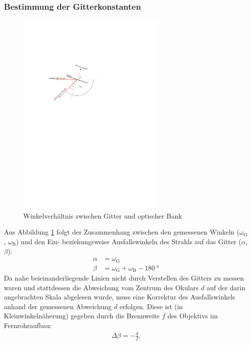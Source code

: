 \documentclass[11pt, a4paper]{article}
\numberwithin{equation}{section}
\begin{document}
\subsubsection{Bestimmung der Gitterkonstanten}
\label{sssec:gitterkonstante}
\begin{figure}[h]
	\centering
	\includegraphics[width=0.65\textwidth]{./figures/winkelverhaeltniss.pdf}
	\caption{Winkelverhältnis zwischen Gitter und optischer Bank}
	\label{fig:winkelverhaeltnis}
\end{figure}
Aus Abbildung \ref{fig:winkelverhaeltnis} folgt der Zusammenhang zwischen den gemessenen Winkeln ($\omega_\mathrm{G}$, $\omega_\mathrm{B}$) und den Ein- beziehungsweise Ausfallswinkeln des Strahls auf das Gitter ($\alpha$, $\beta$): 
\begin{align*}
	\alpha &= \omega_\text{G} \\
	\beta &= \omega_\text{G} + \omega_\text{B} - \SI{180}{\degree}
	\label{eq:reflexionswinkel}
\end{align*}
Da nahe beieinanderliegende Linien nicht durch Verstellen des Gitters zu messen waren und stattdessen die Abweichung vom Zentrum des Okulars $d$ auf der darin angebrachten Skala abgelesen wurde, muss eine Korrektur des Ausfallswinkels anhand der gemessenen Abweichung $d$ erfolgen.
Diese ist (in Kleinwinkelnäherung) gegeben durch die Brennweite $f$ des Objektivs im Fernrohraufbau:
\begin{align*}
\Delta \beta = -\frac{d}{f} \text{,}
\end{align*}
\end{document}
